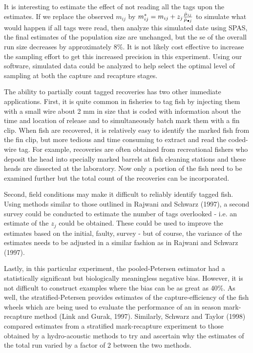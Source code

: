 It is interesting to estimate the effect of not reading all
the tags upon the estimates. 
If we replace the observed $m_{ij}$ by 
$m_{ij}^{*} = m_{ij}+z_j{{\hat \mu _{ij}} \over {\hat \mu _{\bullet j}}}$ 
to simulate what would happen if all tags were read, then
analyze this simulated date using SPAS, the final estimates
of the population size are unchanged, but the se of the
overall run size decreases by approximately 8\%.
It is not likely cost effective to increase the sampling
effort to get this increased precision in this experiment. 
Using our software, simulated data could be analyzed
to help select the optimal level of sampling at
both the capture and recapture stages.

The ability to partially count tagged recoveries has
two other immediate applications.
First, it is quite common in fisheries to tag fish
by injecting them with a small wire about 2 mm in 
size that is coded with information about the time
and location of release and to simultaneously
batch mark them with a fin clip.
When fish are recovered, it is relatively easy to 
identify the marked fish from the fin clip, but more tedious and
time consuming to extract and read the coded-wire
tag. For example, recoveries are often obtained 
from recreational fishers who deposit the head into
specially marked barrels at fish cleaning stations and
these heads are dissected at the laboratory.
Now only a portion of the fish need to be examined
further but the total count of the recoveries
can be incorporated.

Second, field conditions may make it difficult
to reliably identify tagged fish. Using methods similar
to those outlined in Rajwani and Schwarz (1997),
a second survey could be conducted to estimate the number
of tags overlooked - i.e. an estimate of the $z_j$
could be obtained.
These could be used to improve the estimates
based on the initial, faulty, survey - but of 
course, the variance of the estimates needs to be
adjusted in a similar fashion as in Rajwani and
Schwarz (1997).

Lastly, in this particular experiment, the
pooled-Petersen estimator had a statistically
significant but biologically meaningless negative
bias. However, it is not difficult to 
construct examples where the bias can be
as great as 40\%.
As well, the stratified-Petersen provides estimates
of the capture-efficiency of the fish wheels
which 
are being used to evaluate the performance of an in season
mark-recapture method (Link and Gurak, 1997).
Similarly, Schwarz and Taylor (1998) compared
estimates from a stratified mark-recapture experiment
to those obtained by a hydro-acoustic methods to try
and ascertain why the estimates of the total run
varied by a factor of 2 between the two methods.



